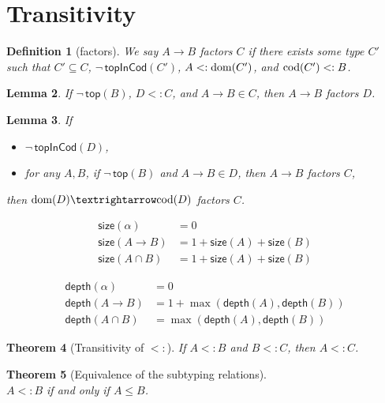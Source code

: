 \documentclass{article}
\newtheorem{theorem}{Theorem}
\newtheorem{lemma}[theorem]{Lemma}
\newtheorem{definition}[theorem]{Definition}
\begin{document}
\section{Transitivity}


\begin{definition}[factors]
  We say $A → B$ \emph{factors} $C$
  if there exists some type $C'$ such that
  $C' ⊆ C$, $\neg\,\mathsf{topInCod}(C')$, $A <: \mathrm{dom}(C')$, and $\mathrm{cod}(C') <: B$.
\end{definition}

\begin{lemma}\label{lem:sub-fun-inv}
  If $\neg\,\mathsf{top}(B)$,
  $D <: C$, and
  $A → B ∈ C$, then
  $A → B$ factors $D$.
\end{lemma}


\begin{lemma}\label{lem:sub-inv-trans}
  If
  \begin{itemize}
  \item $\neg\, \mathsf{topInCod}(D)$,
  \item for any $A,B$, if $\neg\,\mathsf{top}(B)$ and $A → B ∈ D$,
    then $A → B$ factors $C$,
  \end{itemize}
  then $\dom{D} → \cod{D}$ factors $C$.
\end{lemma}

\begin{align*}
  \mathsf{size}(\alpha) &= 0 \\
  \mathsf{size}(A → B) &= 1 + \mathsf{size}(A) + \mathsf{size}(B) \\
  \mathsf{size}(A ∩ B) &= 1 + \mathsf{size}(A) + \mathsf{size}(B)
\end{align*}

\begin{align*}
  \mathsf{depth}(\alpha) &= 0 \\
  \mathsf{depth}(A → B) &= 1 + \max(\mathsf{depth}(A), \mathsf{depth}(B)) \\
  \mathsf{depth}(A ∩ B) &= \max(\mathsf{depth}(A), \mathsf{depth}(B))
\end{align*}

\begin{theorem}[Transitivity of $<:$]\label{lem:sub-trans}
    If $A <: B$ and $B <: C$, then $A <: C$.
\end{theorem}


\begin{theorem}[Equivalence of the subtyping relations]\ \\
  $A <: B$ if and only if $A ≤ B$.
\end{theorem}

\clearpage
\pagebreak



\end{document}
